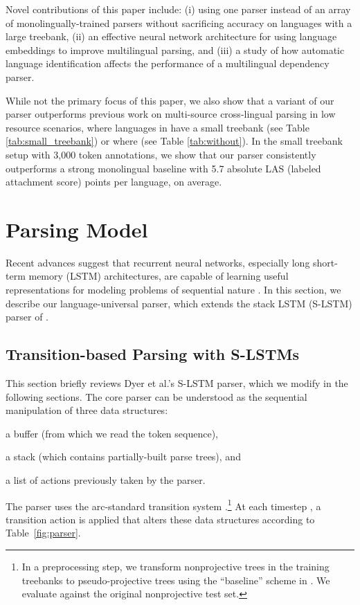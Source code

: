 \documentclass[11pt]{article}
\newenvironment{itemizesquish}{\begin{list}{\labelitemi}{\setlength{\itemsep}{0em}\setlength{\labelwidth}{0.5em}\setlength{\leftmargin}{\labelwidth}\addtolength{\leftmargin}{\labelsep}}}{\end{list}}
\begin{document}
Novel contributions of this paper include: (i) using one parser instead of an array of monolingually-trained parsers without sacrificing accuracy on languages with a large treebank, (ii) an effective neural network architecture for using language embeddings to improve multilingual parsing, and (iii) a study of how automatic language identification affects the performance of a multilingual dependency parser.

While not the primary focus of this paper, we also show that a variant of our parser outperforms previous work on multi-source cross-lingual parsing in low resource scenarios, where languages in  have a small treebank (see Table \ref{tab:small_treebank}) or where  (see Table \ref{tab:without}).
In the small treebank setup with 3,000 token annotations, we show that our parser consistently outperforms a strong monolingual baseline with 5.7 absolute LAS (labeled attachment score) points per language, on average.

\section{Parsing Model}
\label{sec:model}

Recent advances suggest that recurrent neural networks, especially long short-term memory (LSTM) architectures, are capable of learning useful representations for modeling problems of sequential nature  \cite{graves:13,sutskever:14}.
In this section, we describe our language-universal parser, which extends the stack LSTM (S-LSTM) parser of .

\subsection{Transition-based Parsing with S-LSTMs}
\label{sec:slstm}

This section briefly reviews Dyer et al.'s S-LSTM parser, which we modify in the following sections.
The core parser can be understood as the sequential manipulation of three data structures:
\begin{itemizesquish}
\item a buffer (from which we read the token sequence),  
\item a stack (which contains partially-built parse trees), and 
\item a list of actions previously taken by the parser. 
\end{itemizesquish}
The parser uses the arc-standard transition system \cite{nivre:04}.\footnote{In a preprocessing step, we transform nonprojective trees in the training treebanks to pseudo-projective trees using the ``baseline'' scheme in \cite{nivre:05}. We evaluate against the original nonprojective test set.} 
At each timestep , a transition action is applied that alters these data structures according to Table~\ref{fig:parser}.
\end{document}
